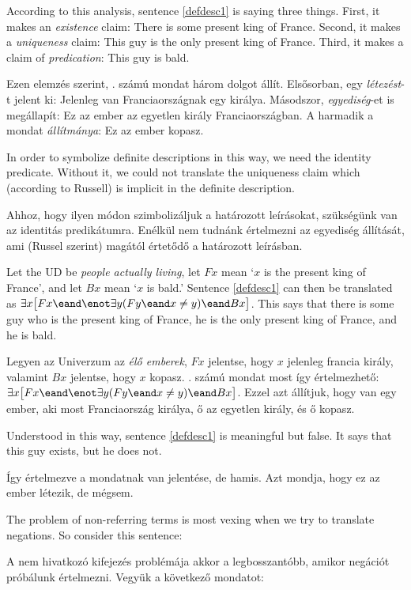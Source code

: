 According to this analysis, sentence \ref{defdesc1} is saying three things. First, it makes an \emph{existence} claim: There is some present king of France. Second, it makes a \emph{uniqueness} claim: This guy is the only present king of France. Third, it makes a claim of \emph{predication}: This guy is bald.

Ezen elemzés szerint, . számú mondat három dolgot állít. Elsősorban, egy \emph{létezést}-t jelent ki: Jelenleg van Franciaországnak egy királya. Másodszor, \emph{egyediség}-et is megállapít: Ez az ember az egyetlen király Franciaországban. A harmadik a mondat \emph{állítmánya}: Ez az ember kopasz.

In order to symbolize definite descriptions in this way, we need the identity predicate. Without it, we could not translate the uniqueness claim which (according to Russell) is implicit in the definite description.

Ahhoz, hogy ilyen módon szimbolizáljuk a határozott leírásokat, szükségünk van az identitás predikátumra. Enélkül nem tudnánk értelmezni az egyediség állítását, ami (Russel szerint) magától értetődő a határozott leírásban.

Let the UD be \emph{people actually living}, let $Fx$ mean `$x$ is the present king of France', and let $Bx$ mean `$x$ is bald.' Sentence \ref{defdesc1} can then be translated as $\exists x\bigl[Fx \eand \enot\exists y(Fy \eand x\neq y) \eand Bx\bigr]$. This says that there is some guy who is the present king of France, he is the only present king of France, and he is bald.

Legyen az Univerzum az \emph{élő emberek}, $Fx$ jelentse, hogy $x$ jelenleg francia király, valamint $Bx$ jelentse, hogy $x$ kopasz. . számú mondat most így értelmezhető: $\exists x\bigl[Fx \eand \enot\exists y(Fy \eand x\neq y) \eand Bx\bigr]$. Ezzel azt állítjuk, hogy van egy ember, aki most Franciaország királya, ő az egyetlen király, és ő kopasz.

Understood in this way, sentence \ref{defdesc1} is meaningful but false. It says that this guy exists, but he does not.

Így értelmezve a mondatnak van jelentése, de hamis. Azt mondja, hogy ez az ember létezik, de mégsem.

The problem of non-referring terms is most vexing when we try to translate negations. So consider this sentence:

A nem hivatkozó kifejezés problémája akkor a legbosszantóbb, amikor negációt próbálunk értelmezni. Vegyük a következő mondatot:

